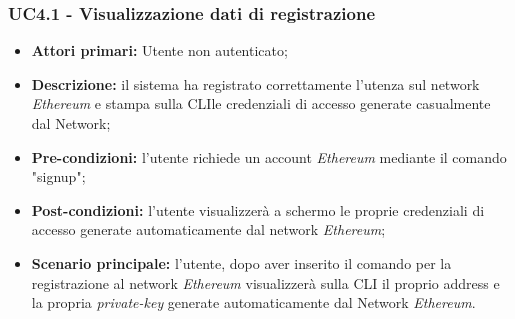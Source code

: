 \subsubsection{UC4.1 - Visualizzazione dati di registrazione}
\begin{itemize}
	\item \textbf{Attori primari:} Utente non autenticato;
	\item \textbf{Descrizione:} il sistema ha registrato correttamente l'utenza sul network \textit{Ethereum\glos} e stampa sulla CLI\glo  le credenziali di accesso generate casualmente dal Network; 
	\item \textbf{Pre-condizioni:} l'utente richiede un account \textit{Ethereum\glo} mediante il comando "signup"; 
	\item \textbf{Post-condizioni:} l'utente visualizzerà a schermo le proprie credenziali di accesso generate automaticamente dal network \textit{Ethereum\glos};
	\item \textbf{Scenario principale:} l'utente, dopo aver inserito il comando per la registrazione al network \textit{Ethereum\glo} visualizzerà sulla CLI il proprio address e la propria \textit{private-key\glo} generate automaticamente dal Network \textit{Ethereum\glos}.
\end{itemize}